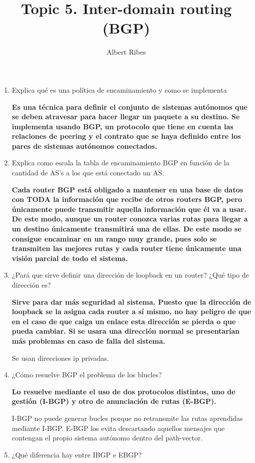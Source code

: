 \documentclass[a4paper]{article}
\author{Albert Ribes}
\title{Topic 5. Inter-domain routing (BGP)}
\begin{document}
    \maketitle

    \begin{enumerate}
        \item Explica qué es una política de encaminamiento y como se implementa

        {\bfseries
            Es una técnica para definir el conjunto de sistemas autónomos que se deben atravesar para hacer llegar un paquete a su destino.
            Se implementa usando BGP, un protocolo que tiene en cuenta las relaciones de peering y el contrato que se haya definido entre los pares de sistemas autónomos conectados.
        }
        \item Explica como escala la tabla de encaminamiento BGP en función de la cantidad de AS’s a
        los que está conectado un AS.


        {\bfseries
            Cada router BGP está obligado a mantener en una base de datos con TODA la información que recibe de otros routers BGP, pero únicamente puede transmitir aquella información que él va a usar. De este modo, aunque un router conozca varias rutas para llegar a un destino únicamente transmitirá una de ellas. De este modo se consigue encaminar en un rango muy grande, pues solo se transmiten las mejores rutas y cada router tiene únicamente una visión parcial de todo el sistema.
        }
        \item ¿Pará que sirve definir una dirección de loopback en un router? ¿Qué tipo de dirección
        es?

        {\bfseries
            Sirve para dar más seguridad al sistema. Puesto que la dirección de loopback se la asigna cada router a sí mismo, no hay peligro de que en el caso de que caiga un enlace esta dirección se pierda o que pueda cambiar. Si se usara una dirección normal se presentarían más problemas en caso de falla del sistema.

            Se usan direcciones ip privadas.
        }
        \item ¿Cómo resuelve BGP el problema de los blucles?

        {\bfseries
            Lo resuelve mediante el uso de dos protocolos distintos, uno de gestión (I-BGP) y otro de anunciación de rutas (E-BGP).

            I-BGP no puede generar bucles porque no retransmite las rutas aprendidas mediante I-BGP. E-BGP los evita descartando aquellos mensajes que contengan el propio sistema autónomo dentro del path-vector.
        }
        \item ¿Qué diferencia hay entre IBGP e EBGP?


\end{enumerate}
\end{document}
